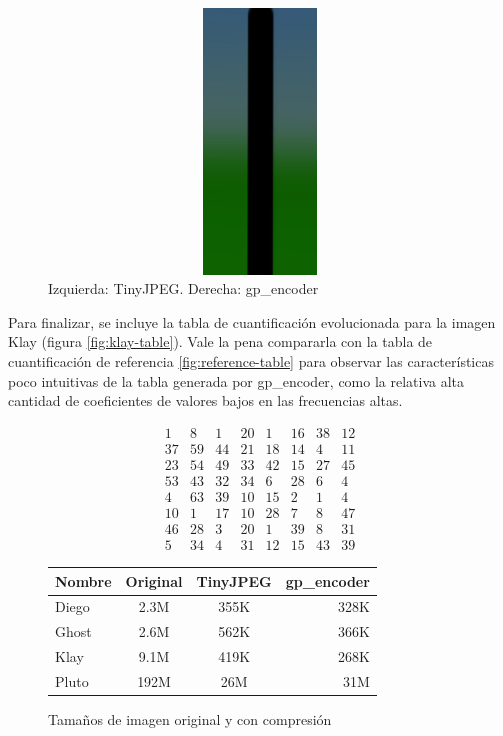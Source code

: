 \begin{figure}
    \includegraphics[width=400pt, height=200pt]{banding}
    \caption{Izquierda: TinyJPEG. Derecha: gp\_encoder}
    \label{img:banding}
\end{figure}

Para finalizar, se incluye la tabla de cuantificación evolucionada para la
imagen Klay (figura \ref{fig:klay-table}). Vale la pena compararla con la tabla de
cuantificación de referencia \ref{fig:reference-table} para observar las
características poco intuitivas de la tabla generada por gp\_encoder, como la
relativa alta cantidad de coeficientes de valores bajos en las frecuencias
altas.


\begin{equation}
    \begin{matrix}
        1  &   8  &  1  & 20  &  1  & 16  & 38  & 12 \\
        37 &   59 &  44 &  21 &  18 &  14 &   4 &  11 \\
        23 &   54 &  49 &  33 &  42 &  15 &  27 &  45 \\
        53 &   43 &  32 &  34 &   6 &  28 &   6 &   4 \\
        4  &  63  & 39  & 10  & 15  &  2  &  1  &  4 \\
        10 &    1 &  17 &  10 &  28 &   7 &   8 &  47 \\
        46 &   28 &   3 &  20 &   1 &  39 &   8 &  31 \\
        5  &  34  &  4  & 31  & 12  & 15  & 43  & 39
    \end{matrix}
    \label{fig:klay-table}
\end{equation}

\begin{figure}[h]
    \begin{tabular}{|l c c r|}
        \hline
        Nombre & Original & TinyJPEG & gp\_encoder \\
        \hline
        Diego & 2.3M & 355K & 328K \\
        Ghost & 2.6M & 562K & 366K \\
        Klay  & 9.1M & 419K & 268K \\
        Pluto & 192M & 26M & 31M  \\
        \hline
    \end{tabular}
    \caption{Tamaños de imagen original y con compresión}
    \label{fig:size-table}
\end{figure}


